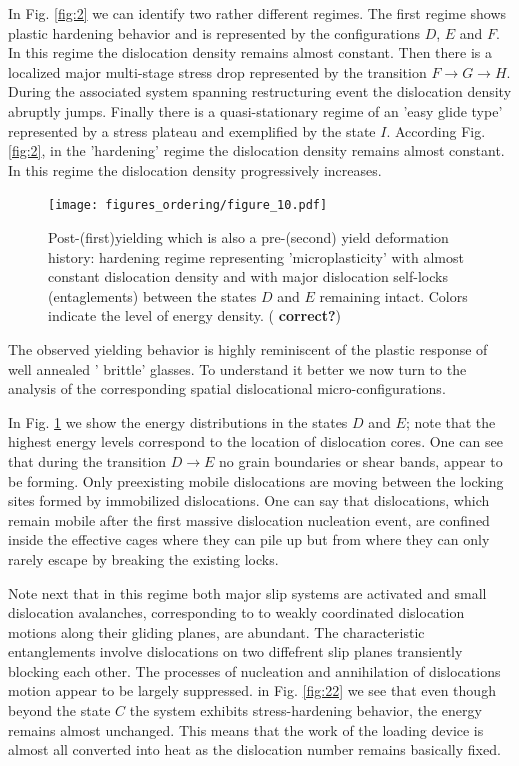 \documentclass[aps,
superscriptaddress,notitlepage]{revtex4-1}
\begin{document}
In  Fig. \ref{fig:2} we can identify  two rather different regimes.
 The first regime shows plastic hardening behavior and is represented by the configurations $D$, $E$ and $F$. In this regime the dislocation density remains almost constant.
 Then there is a localized major multi-stage stress drop represented by the transition $F \to G \to H$.  During the associated system spanning restructuring event   the dislocation density abruptly jumps.   Finally there is a  quasi-stationary  regime of an 'easy glide type' represented by a stress plateau and exemplified by the state  $I$.
According Fig. \ref{fig:2}, in the  'hardening' regime  the dislocation density remains almost constant. In this regime the dislocation density  progressively increases. 
 
\begin{figure}[h!]
\texttt{[image: figures\_ordering/figure\_10.pdf]}
\caption{Post-(first)yielding which is also a pre-(second) yield deformation history: hardening regime representing 'microplasticity'  with almost constant dislocation density and with major dislocation self-locks (entaglements) between the states $D$ and $E$ remaining intact. Colors indicate the level of energy density. ( \textbf{correct?})}
\label{fig:03}
\end{figure}

 The observed   yielding behavior is  highly reminiscent of the plastic  response of well annealed ' brittle' glasses. To understand it better we now turn to the analysis of the corresponding  spatial dislocational micro-configurations.
 
 
In Fig. \ref{fig:03}  we show the  energy distributions in the states  $D$  and $E$;  note that the highest energy levels  correspond to the location of dislocation cores. One can see that during the transition $D \to E$  no  grain boundaries or shear bands,  appear to be forming. Only  preexisting mobile dislocations  are  moving between the  locking sites formed by immobilized dislocations.   One can say that  dislocations, which remain mobile after the first massive dislocation nucleation event, are confined inside the effective cages where they can pile up but from where they can only rarely escape by  breaking the  existing locks. 
 
 
Note next that in this regime  both major slip systems are activated and  small dislocation avalanches,  corresponding to to weakly coordinated dislocation motions along their gliding planes, are abundant.  The characteristic  entanglements involve  dislocations on two diffefrent slip planes transiently blocking each other.  The processes of nucleation and annihilation of dislocations  motion appear to be  largely suppressed.  in Fig. \ref{fig:22} we see that  even though beyond the state $C$ the system exhibits stress-hardening behavior,  the energy remains  almost unchanged. This means that the work of the loading device is almost all converted into heat  as the dislocation number remains basically fixed. 
\end{document}
